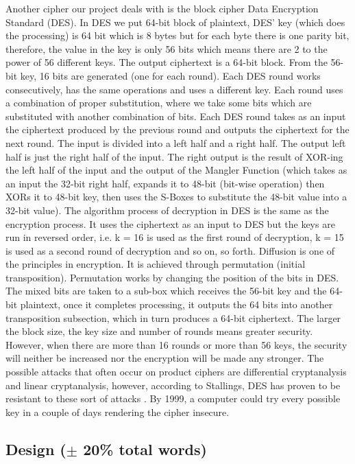 Another cipher our project deals with is the block cipher Data Encryption Standard (DES). In DES we put 64-bit block of plaintext,  DES' key (which does the processing) is 64 bit which is 8 bytes but for each byte there is one parity bit, therefore, the value in the key is only 56 bits which means there are 2 to the power of 56 different keys. The output ciphertext is a 64-bit block. 
From the 56-bit key, 16 bits are generated (one for each round). Each DES round works consecutively, has the same operations and uses a different key. Each round uses a combination of proper substitution, where we take some bits which are substituted with another combination of bits. Each DES round takes as an input the ciphertext produced by the previous round and outputs the ciphertext for the next round. The input is divided into a left half and a right half. The output left half is just the right half of the input. The right output is the result of XOR-ing the left half of the input and the output of the Mangler Function (which takes as an input the 32-bit right half, expands it to 48-bit (bit-wise operation) then XORs it to 48-bit key, then uses the S-Boxes to substitute the 48-bit value into a 32-bit value).
The algorithm process of decryption in DES is the same as the encryption process. It uses the ciphertext as an input to DES but the keys are run in reversed order, i.e. k = 16 is used as the first round of decryption, k = 15 is used as a second round of decryption and so on, so forth. 
Diffusion is one of the principles in encryption. It is achieved through permutation (initial transposition). Permutation works by changing the position of the bits in DES. The mixed bits are taken to a sub-box which receives the 56-bit key and the 64-bit plaintext, once it completes processing, it outputs the 64 bits into another transposition subsection, which in turn produces a 64-bit ciphertext. 
The larger the block size, the key size and number of rounds means greater security. However, when there are more than 16 rounds or more than 56 keys, the security will neither be increased nor the encryption will be made any stronger. The possible attacks that often occur on product ciphers are differential cryptanalysis and linear cryptanalysis, however, according to Stallings, DES has proven to be resistant to these sort of attacks \cite{stallings2011-a}. By 1999, a computer could try every possible key in a couple of days rendering the cipher insecure.

\subsection{Design ($\pm$ 20\% total words)}

